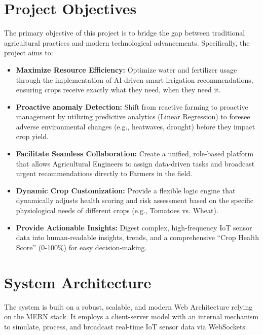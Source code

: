 \documentclass[12pt,a4paper]{article}
\begin{document}
\section{Project Objectives}
The primary objective of this project is to bridge the gap between traditional agricultural practices and modern technological advancements. Specifically, the project aims to:
\begin{itemize}
    \item \textbf{Maximize Resource Efficiency:} Optimize water and fertilizer usage through the implementation of AI-driven smart irrigation recommendations, ensuring crops receive exactly what they need, when they need it.
    \item \textbf{Proactive anomaly Detection:} Shift from reactive farming to proactive management by utilizing predictive analytics (Linear Regression) to foresee adverse environmental changes (e.g., heatwaves, drought) before they impact crop yield.
    \item \textbf{Facilitate Seamless Collaboration:} Create a unified, role-based platform that allows Agricultural Engineers to assign data-driven tasks and broadcast urgent recommendations directly to Farmers in the field.
    \item \textbf{Dynamic Crop Customization:} Provide a flexible logic engine that dynamically adjusts health scoring and risk assessment based on the specific physiological needs of different crops (e.g., Tomatoes vs. Wheat).
    \item \textbf{Provide Actionable Insights:} Digest complex, high-frequency IoT sensor data into human-readable insights, trends, and a comprehensive ``Crop Health Score'' (0-100\%) for easy decision-making.
\end{itemize}

\section{System Architecture}
The system is built on a robust, scalable, and modern Web Architecture relying on the MERN stack. It employs a client-server model with an internal mechanism to simulate, process, and broadcast real-time IoT sensor data via WebSockets.
\end{document}
